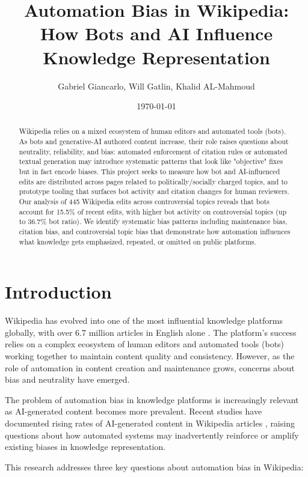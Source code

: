 \documentclass[11pt]{article}
\title{Automation Bias in Wikipedia: How Bots and AI Influence Knowledge Representation}
\author{Gabriel Giancarlo, Will Gatlin, Khalid AL-Mahmoud}
\date{\today}
\begin{document}
\maketitle

\begin{abstract}
Wikipedia relies on a mixed ecosystem of human editors and automated tools (bots). As bots and generative-AI authored content increase, their role raises questions about neutrality, reliability, and bias: automated enforcement of citation rules or automated textual generation may introduce systematic patterns that look like "objective" fixes but in fact encode biases. This project seeks to measure how bot and AI-influenced edits are distributed across pages related to politically/socially charged topics, and to prototype tooling that surfaces bot activity and citation changes for human reviewers. Our analysis of 445 Wikipedia edits across controversial topics reveals that bots account for 15.5\% of recent edits, with higher bot activity on controversial topics (up to 36.7\% bot ratio). We identify systematic bias patterns including maintenance bias, citation bias, and controversial topic bias that demonstrate how automation influences what knowledge gets emphasized, repeated, or omitted on public platforms.
\end{abstract}

\section{Introduction}

Wikipedia has evolved into one of the most influential knowledge platforms globally, with over 6.7 million articles in English alone \citep{wikipedia_stats}. The platform's success relies on a complex ecosystem of human editors and automated tools (bots) working together to maintain content quality and consistency. However, as the role of automation in content creation and maintenance grows, concerns about bias and neutrality have emerged.

The problem of automation bias in knowledge platforms is increasingly relevant as AI-generated content becomes more prevalent. Recent studies have documented rising rates of AI-generated content in Wikipedia articles \citep{brooks2024rise}, raising questions about how automated systems may inadvertently reinforce or amplify existing biases in knowledge representation.

This research addresses three key questions about automation bias in Wikipedia:
\end{document}
